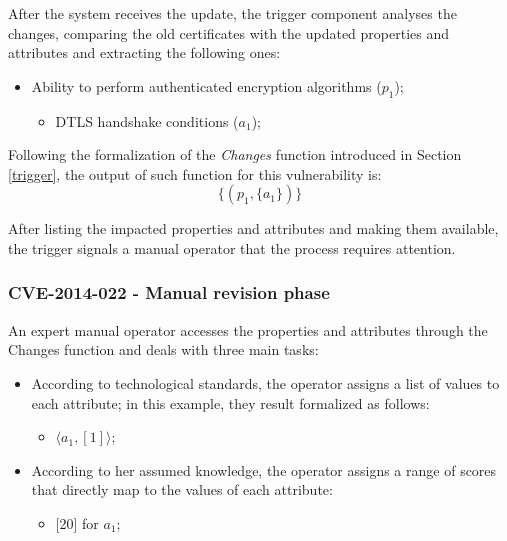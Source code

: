 After the system receives the update, the trigger component analyses the changes, comparing the old certificates with the updated properties and attributes and extracting the following ones:
\begin{itemize}
    \item Ability to perform authenticated encryption algorithms (\(p_1\));
    \begin{itemize}
        \item DTLS handshake conditions (\(a_1\));
    \end{itemize}
\end{itemize}

Following the formalization of the \textit{Changes} function introduced in Section \ref{trigger}, the output of such function for this vulnerability is: \[ \{ (p_1, \{a_1\})\}\]

After listing the impacted properties and attributes and making them available, the trigger signals a manual operator that the process requires attention.

\subsubsection{CVE-2014-022 - Manual revision phase}
An expert manual operator accesses the properties and attributes through the Changes function and deals with three main tasks:
\begin{itemize}
    \item According to technological standards, the operator assigns a list of values to each attribute; in this example, they result formalized as follows:
    \begin{itemize}
        \item \(\langle a_1, [1]\rangle\);
    \end{itemize}
    
    \item According to her assumed knowledge, the operator assigns a range of scores that directly map to the values of each attribute:
    \begin{itemize}
        \item {[20]} for \(a_1\);
    \end{itemize}
\end{itemize}


